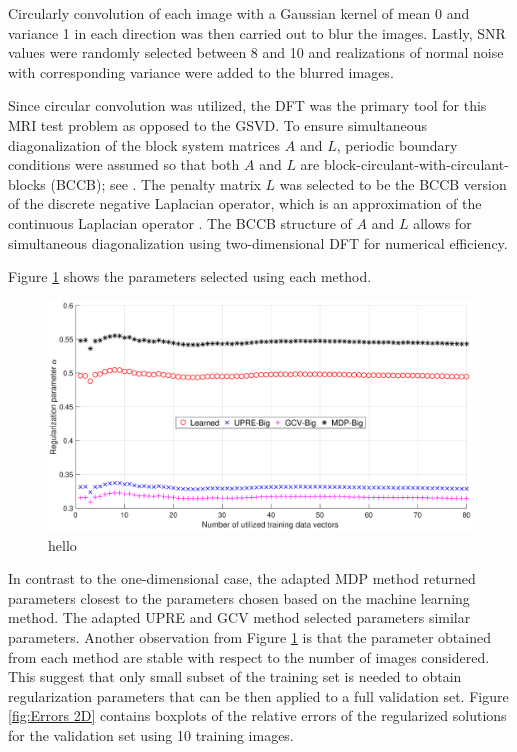\documentclass[12pt]{article}
\begin{document}
Circularly convolution of each image with a Gaussian kernel of mean 0 and variance 1 in each direction was then carried out to blur the images. Lastly, SNR values were randomly selected between 8 and 10 and realizations of normal noise with corresponding variance were added to the blurred images. \par 
Since circular convolution was utilized, the DFT was the primary tool for this MRI test problem as opposed to the GSVD. To ensure simultaneous diagonalization of the block system matrices $A$ and $L$, periodic boundary conditions were assumed so that both $A$ and $L$ are block-circulant-with-circulant-blocks (BCCB); see \cite{NeumannDCT,Vogel:2002}. The penalty matrix $L$ was selected to be the BCCB version of the discrete negative Laplacian operator, which is an approximation of the continuous Laplacian operator \cite{DebnathMikusinski2005,LeVeque2007}. The BCCB structure of $A$ and $L$ allows for simultaneous diagonalization using two-dimensional DFT for numerical efficiency. \par 
Figure \ref{fig:Parameters 2D} shows the parameters selected using each method. 
\begin{figure}[ht]
\includegraphics[scale=0.36]{Figures/Parameters2D_mri}
\caption{hello}
\label{fig:Parameters 2D}
\end{figure}
In contrast to the one-dimensional case, the adapted MDP method returned parameters closest to the parameters chosen based on the machine learning method. The adapted UPRE and GCV method selected parameters similar parameters. Another observation from Figure \ref{fig:Parameters 2D} is that the parameter obtained from each method are stable with respect to the number of images considered. This suggest that only small subset of the training set is needed to obtain regularization parameters that can be then applied to a full validation set. Figure \ref{fig:Errors 2D} contains boxplots of the relative errors of the regularized solutions for the validation set using 10 training images. 
\end{document}
